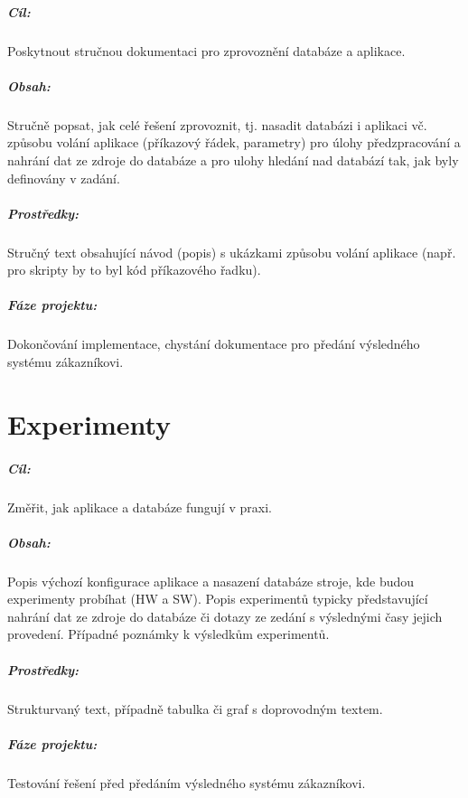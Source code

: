 \documentclass[10pt,xcolor=pdflatex,dvipsnames,table,oneside]{book}
\begin{document}
\paragraph{Cíl:}
Poskytnout stručnou dokumentaci pro zprovoznění databáze a aplikace.

\paragraph{Obsah:}
Stručně popsat, jak celé řešení zprovoznit, tj. nasadit databázi i aplikaci vč. způsobu volání aplikace (příkazový řádek, parametry) pro úlohy
předzpracování a nahrání dat ze zdroje do databáze a pro ulohy hledání nad databází tak, jak byly definovány v zadání.

\paragraph{Prostředky:}
Stručný text obsahující návod (popis) s ukázkami způsobu volání aplikace (např. pro skripty by to byl kód příkazového řadku).

\paragraph{Fáze projektu:}
Dokončování implementace, chystání dokumentace pro předání výsledného systému zákazníkovi.

\chapter{Experimenty}

\paragraph{Cíl:}
Změřit, jak aplikace a databáze fungují v praxi.

\paragraph{Obsah:}
Popis výchozí konfigurace aplikace a nasazení databáze stroje, kde budou experimenty probíhat (HW a SW).
Popis experimentů typicky představující nahrání dat ze zdroje do databáze či dotazy ze zedání s výslednými časy jejich provedení.
Případné poznámky k výsledkům experimentů.

\paragraph{Prostředky:}
Strukturvaný text, případně tabulka či graf s doprovodným textem.

\paragraph{Fáze projektu:}
Testování řešení před předáním výsledného systému zákazníkovi.
\end{document}
